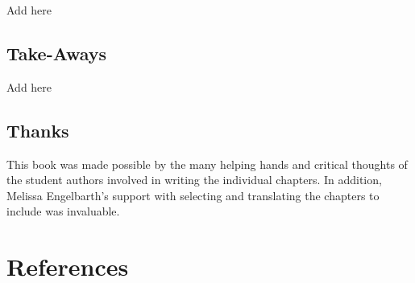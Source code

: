 \documentclass[
  letterpaper,
]{book}
\begin{document}

Add here

\section*{Take-Aways}\label{take-aways}


Add here

\section*{Thanks}\label{thanks}


This book was made possible by the many helping hands and critical
thoughts of the student authors involved in writing the individual
chapters. In addition, Melissa Engelbarth's support with selecting and
translating the chapters to include was invaluable.


\chapter*{References}\label{references}

\end{document}
